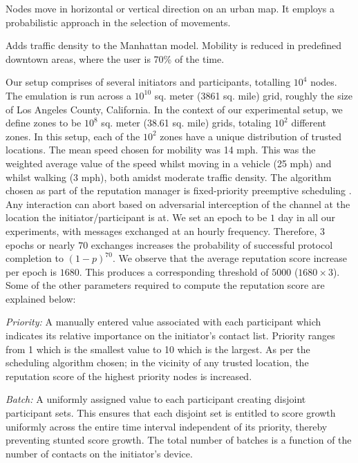 \documentclass[letterpaper,twocolumn]{sig-alternate}
\begin{document}
\vspace{1mm}
 Nodes move in horizontal or vertical direction on an urban map. It employs a probabilistic approach in the selection of movements. 

\vspace{1mm}
 Adds traffic density to the Manhattan model. Mobility is reduced in predefined downtown areas, where the user is 70\% of the time.

\vspace{1mm}
 Our setup comprises of several initiators and participants, totalling $10^4$ nodes. The emulation is run across a $10^{10}$ sq. meter (3861 sq. mile) grid, roughly the size of Los Angeles County, California. In the context of our experimental setup, we define zones to be $10^8$ sq. meter (38.61 sq. mile) grids, totaling $10^2$ different zones. In this setup, each of the $10^2$ zones have a unique distribution of trusted locations. The mean speed chosen for mobility was 14 mph. This was the weighted average value of the speed whilst moving in a vehicle (25 mph) and whilst walking (3 mph), both amidst moderate traffic density. The algorithm chosen as part of the reputation manager is fixed-priority preemptive scheduling \cite{audsley1995fixed}. Any interaction can abort based on adversarial interception of the channel at the location the initiator/participant is at. We set an epoch to be $1$ day in all our experiments, with messages exchanged at an hourly frequency. Therefore, $3$ epochs or nearly $70$ exchanges increases the probability of successful protocol completion to $(1-p)^{70}$. We observe that the average reputation score increase per epoch is $1680$. This produces a corresponding threshold of $5000$ ($1680 \times 3$). Some of the other parameters required to compute the reputation score are explained below:

\vspace{1mm}
{\em Priority:} A manually entered value associated with each participant which indicates its relative importance on the initiator's contact list. Priority ranges from 1 which is the smallest value to 10 which is the largest. As per the scheduling algorithm chosen; in the vicinity of any trusted location, the reputation score of the highest priority nodes is increased.

\vspace{1mm}
{\em Batch:} A uniformly assigned value to each participant creating disjoint participant sets. This ensures that each disjoint set is entitled to score growth uniformly across the entire time interval independent of its priority, thereby preventing stunted score growth. The total number of batches is a function of the number of contacts on the initiator's device.
\vspace{1mm}
\end{document}
